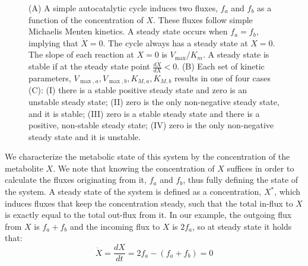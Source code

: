\documentclass[a4page,notitlepage]{article}
\begin{document}
\begin{figure}[h!]
\begin{minipage}[c]{.65\linewidth}
{}
       \end{minipage}
      \caption{\label{fig:simplecycle}
        (A) A simple autocatalytic cycle induces two fluxes, $f_a$ and $f_b$ as a function of the concentration of $X$.
        These fluxes follow simple Michaelis Menten kinetics.
        A steady state occurs when $f_a=f_b$, implying that $\dot{X}=0$.
        The cycle always has a steady state at $X=0$.
        The slope of each reaction at $X=0$ is $V_{\max}/K_m$.
        A steady state is stable if at the steady state point $\frac{d\dot{X}}{dX}<0$.
        (B) Each set of kinetic parameters, $V_{\max,a},V_{\max,b},K_{M,a},K_{M,b}$ results in one of four cases (C): 
       (I) there is a stable positive steady state and zero is an unstable steady state; 
       (II) zero is the only non-negative steady state, and it is stable;
       (III) zero is a stable steady state and there is a positive, non-stable steady state; 
       (IV) zero is the only non-negative steady state and it is unstable.}
    \end{figure}

    We characterize the metabolic state of this system by the concentration of the metabolite $X$.
    We note that knowing the concentration of $X$ suffices in order to calculate the fluxes originating from it, $f_a$ and $f_b$, thus fully defining the state of the system.
    A steady state of the system is defined as a concentration, $X^*$, which induces fluxes that keep the concentration steady, such that the total in-flux to $X$ is exactly equal to the total out-flux from it.
    In our example, the outgoing flux from $X$ is $f_a+f_b$ and the incoming flux to $X$ is $2f_a$, so at steady state it holds that:
    \begin{equation}
      \label{eq:xdyna}
      \dot X = \frac{dX}{dt} = 2f_a - (f_a + f_b) = 0
    \end{equation}
\end{document}
